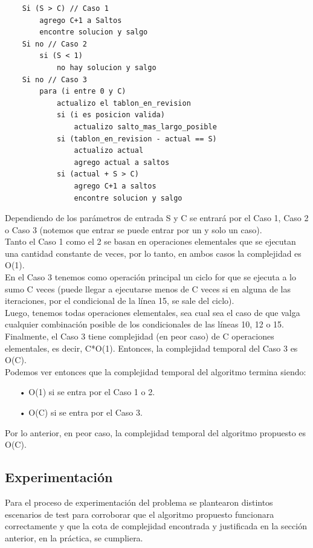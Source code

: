 \documentclass[10pt,a4paper]{article}
\begin{document}
\begin{lstlisting}
	Si (S > C) // Caso 1
		agrego C+1 a Saltos
		encontre solucion y salgo
	Si no // Caso 2
		si (S < 1)	
			no hay solucion y salgo
	Si no // Caso 3
		para (i entre 0 y C)
			actualizo el tablon_en_revision
			si (i es posicion valida)
				actualizo salto_mas_largo_posible
			si (tablon_en_revision - actual == S)
				actualizo actual
				agrego actual a saltos
			si (actual + S > C)
				agrego C+1 a saltos
				encontre solucion y salgo

\end{lstlisting}

\noindent Dependiendo de los par\'ametros de entrada S y C se entrar\'a por el Caso 1, Caso 2 o Caso 3 (notemos que entrar se puede entrar por un y solo un caso).\\
Tanto el Caso 1 como el 2 se basan en operaciones elementales que se ejecutan una cantidad constante de veces, por lo tanto, en ambos casos la complejidad es O(1).\\
En el Caso 3 tenemos como operaci\'on principal un ciclo for que se ejecuta a lo sumo C veces (puede llegar a ejecutarse menos de C veces si en alguna de las iteraciones, por el condicional de la l\'inea 15, se sale del ciclo).\\
Luego, tenemos todas operaciones elementales, sea cual sea el caso de que valga cualquier combinaci\'on posible de los condicionales de las l\'ineas 10, 12 o 15.\\
Finalmente, el Caso 3 tiene complejidad (en peor caso) de C operaciones elementales, es decir, C*O(1). Entonces, la complejidad temporal del Caso 3 es O(C).\\
Podemos ver entonces que la complejidad temporal del algoritmo termina siendo:\\
\begin{itemize}
\item[•]O(1) si se entra por el Caso 1 o 2.
\item[•]O(C) si se entra por el Caso 3.\\
\end{itemize}
Por lo anterior, en peor caso, la complejidad temporal del algoritmo propuesto es O(C).\newpage

\subsection{Experimentación}
\noindent Para el proceso de experimentación del problema se plantearon distintos escenarios de test para corroborar que el algoritmo propuesto funcionara correctamente y que la cota de complejidad encontrada y justificada en la sección anterior, en la práctica, se cumpliera.\\
\end{document}
